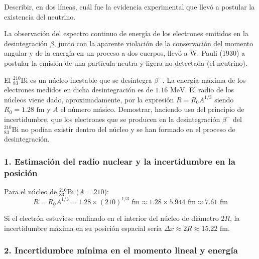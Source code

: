 \begin{problema}
Describir, en dos líneas, cuál fue la evidencia experimental que llevó a postular la existencia del neutrino.

\tcblower

La observación del espectro continuo de energía de los electrones emitidos en la desintegración $\beta$, junto con la aparente violación de la conservación del momento angular y de la energía en un proceso a dos cuerpos, llevó a W. Pauli (1930) a postular la emisión de una partícula neutra y ligera no detectada (el neutrino).
\end{problema}

\begin{problema}
El ${}_{83}^{210}\text{Bi}$ es un núcleo inestable que se desintegra $\beta^-$. La energía máxima de los electrones medidos en dicha desintegración es de $1.16\text{ MeV}$. El radio de los núcleos viene dado, aproximadamente, por la expresión $R = R_0 A^{1/3}$ siendo $R_0 = 1.28\text{ fm}$ y $A$ el número másico. Demostrar, haciendo uso del principio de incertidumbre, que los electrones que se producen en la desintegración $\beta^-$ del ${}_{83}^{210}\text{Bi}$ no podían existir dentro del núcleo y se han formado en el proceso de desintegración.

\tcblower

\subsubsection*{1. Estimación del radio nuclear y la incertidumbre en la posición}

Para el núcleo de ${}_{83}^{210}\text{Bi}$ ($A = 210$):
\begin{equation*}
R = R_0 A^{1/3} = 1.28 \times (210)^{1/3}\text{ fm} \approx 1.28 \times 5.944\text{ fm} \approx 7.61\text{ fm}
\end{equation*}

Si el electrón estuviese confinado en el interior del núcleo de diámetro $2R$, la incertidumbre máxima en su posición espacial sería $\Delta x \approx 2R \approx 15.22\text{ fm}$.

\subsubsection*{2. Incertidumbre mínima en el momento lineal y energía}


\end{problema}
